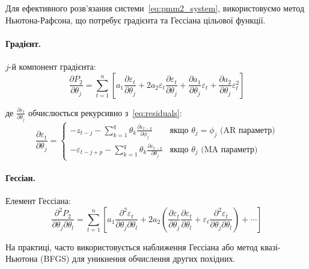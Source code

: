 \documentclass[12pt,a4paper]{article}
\begin{document}
Для ефективного розв'язання системи~\eqref{eq:pmm2_system}, використовуємо метод Ньютона-Рафсона, що потребує градієнта та Гессіана цільової функції.

\paragraph{Градієнт.}

$j$-й компонент градієнта:
\begin{equation}
\label{eq:gradient_j}
\frac{\partial P_2}{\partial \theta_j} = \sum_{t=1}^{n} \left[ a_1 \frac{\partial \varepsilon_t}{\partial \theta_j} + 2 a_2 \varepsilon_t \frac{\partial \varepsilon_t}{\partial \theta_j} + \frac{\partial a_1}{\partial \theta_j} \varepsilon_t + \frac{\partial a_2}{\partial \theta_j} \varepsilon_t^2 \right]
\end{equation}

де $\frac{\partial \varepsilon_t}{\partial \theta_j}$ обчислюється рекурсивно з~\eqref{eq:residuals}:
\begin{equation}
\label{eq:residual_derivative}
\frac{\partial \varepsilon_t}{\partial \theta_j} = \begin{cases}
-z_{t-j} - \sum_{k=1}^{q} \theta_k \frac{\partial \varepsilon_{t-k}}{\partial \phi_j} & \text{якщо } \theta_j = \phi_j \text{ (AR параметр)} \\
-\varepsilon_{t-j+p} - \sum_{k=1}^{q} \theta_k \frac{\partial \varepsilon_{t-k}}{\partial \theta_j} & \text{якщо } \theta_j \text{ (MA параметр)}
\end{cases}
\end{equation}

\paragraph{Гессіан.}

Елемент Гессіана:
\begin{equation}
\label{eq:hessian_jl}
\frac{\partial^2 P_2}{\partial \theta_j \partial \theta_l} = \sum_{t=1}^{n} \left[ a_1 \frac{\partial^2 \varepsilon_t}{\partial \theta_j \partial \theta_l} + 2 a_2 \left( \frac{\partial \varepsilon_t}{\partial \theta_j} \frac{\partial \varepsilon_t}{\partial \theta_l} + \varepsilon_t \frac{\partial^2 \varepsilon_t}{\partial \theta_j \partial \theta_l} \right) + \cdots \right]
\end{equation}

На практиці, часто використовується наближення Гессіана або метод квазі-Ньютона (BFGS) для уникнення обчислення других похідних.
\end{document}
